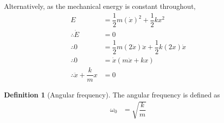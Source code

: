 \documentclass[fleqn, a4paper, 12pt]{article}
\theoremstyle{definition}
\newtheorem{definition}{Definition}
\theoremstyle{theorem}
\begin{document}
Alternatively, as the mechanical energy is constant throughout,
\begin{align*}
	E &= \dfrac{1}{2} m (\dot{x})^2 + \dfrac{1}{2} k x^2\\
	\therefore \dot{E} &= 0\\
	\therefore 0 &= \dfrac{1}{2} m (2 \dot{x}) \ddot{x}+ \dfrac{1}{2} k (2x) \dot{x}\\
	\therefore 0 &= \dot{x} \left( m \ddot{x} + k x \right)\\
	\therefore \ddot{x} + \dfrac{k}{m} x &= 0
\end{align*}

\begin{definition}[Angular frequency]
	The angular frequency is defined as
	\begin{align*}
		\omega_0 &= \sqrt{\dfrac{k}{m}}
	\end{align*}
\end{definition}
\end{document}
